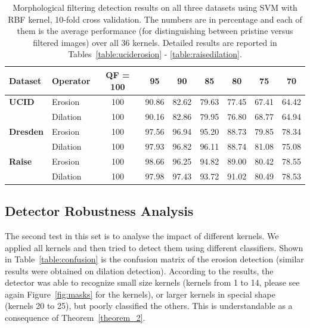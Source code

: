 \documentclass{ieeeaccess}
\begin{document}
\begin{table}[t!]
	\centering
	\caption{Morphological filtering detection results on all three datasets  using SVM with RBF kernel, 10-fold cross validation. The numbers are in percentage and each of them is the average performance (for distinguishing between pristine versus filtered images) over all 36 kernels. Detailed results are reported in Tables~\ref{table:uciderosion} - \ref{table:raisedilation}.}
	\label{table:detection_results}
		\begin{tabular}{l|l|ccccccc}
			\hline\hline
			\textbf{Dataset} & \textbf{Operator} & \textbf{QF = 100} & \textbf{95} & \textbf{90} & \textbf{85} & \textbf{80} & \textbf{75} & \textbf{70} \\
			\hline
			\textbf{UCID} & Erosion & 100 & 90.86 & 82.62 & 79.63 & 77.45 & 67.41 & 64.42 \\
			& Dilation & 100 & 90.16 & 82.86 & 79.95 & 76.80 & 68.77 & 64.94 \\
			\hline
			\textbf{Dresden} & Erosion & 100 & 97.56 & 96.94 & 95.20 & 88.73 & 79.85 & 78.34 \\
			& Dilation & 100 & 97.93 & 96.82 & 96.11 & 88.74 & 81.08 & 75.08 \\
			\hline
			\textbf{Raise} & Erosion & 100 & 98.66 & 96.25 & 94.82 & 89.00 & 80.42 & 78.55 \\
			& Dilation & 100 & 97.98 & 97.43 & 93.72 & 91.02 & 80.49 & 78.53 \\
			\hline\hline
	\end{tabular}%
\end{table}

\subsection{Detector Robustness Analysis}
\label{subsec:result_attacks}

The second test in this set is to analyse the impact of different kernels. We applied all kernels and then tried to detect them using different classifiers. Shown in Table~\ref{table:confusion} is the confusion matrix of the erosion detection (similar results were obtained on dilation detection). According to the results, the detector was able to recognize small size kernels (kernels from 1 to 14, please see again Figure~\ref{fig:masks} for the kernels), or larger kernels in special shape (kernels 20 to 25), but poorly classified the others. This is understandable as a consequence of Theorem~\ref{theorem_2}.
\end{document}
